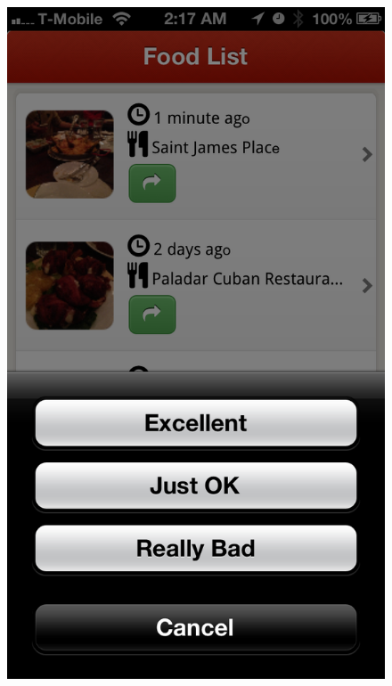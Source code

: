 \begin{figure}
{	\includegraphics[width=\figwidth, totalheight=\figheight, keepaspectratio]{./screenshots/foodlist-rate.png}} \hfill
\end{figure}

